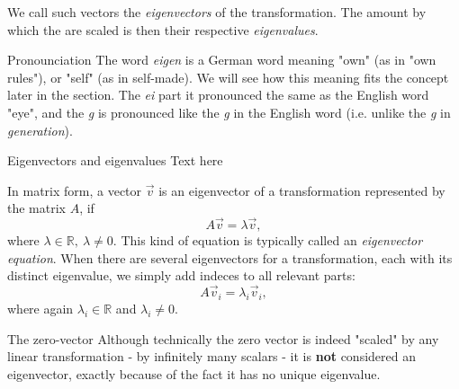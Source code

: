 We call such vectors the \emph{eigenvectors} of the transformation. The amount by which the are scaled is then their respective \emph{eigenvalues}.

\begin{note}{Pronounciation}{}
	The word \textit{eigen} is a German word meaning "own" (as in "own rules"), or "self" (as in self-made). We will see how this meaning fits the concept later in the section. The \textit{ei} part it pronounced the same as the English word "eye", and the \textit{g} is pronounced like the \textit{g} in the English word  (i.e. unlike the \textit{g} in \textit{generation}).
\end{note}

\begin{example}{Eigenvectors and eigenvalues}{}
	Text here
\end{example}

In matrix form, a vector $\vec{v}$ is an eigenvector of a transformation represented by the matrix $A$, if
\begin{equation}
	A\vec{v} = \lambda\vec{v},
	\label{eq:eigenvector_matrix_form}
\end{equation}
where $\lambda\in\mathbb{R},\ \lambda\neq0$. This kind of equation is typically called an \emph{eigenvector equation}. When there are several eigenvectors for a transformation, each with its distinct eigenvalue, we simply add indeces to all relevant parts:
\begin{equation}
	A\vec{v}_{i} = \lambda_{i}\vec{v}_{i},
	\label{eq:eigenvector_matrix_form_indeces}
\end{equation}
where again $\lambda_{i}\in\mathbb{R}$ and $\lambda_{i}\neq0$.

\begin{note}{The zero-vector}{}
	Although technically the zero vector is indeed "scaled" by any linear transformation - by infinitely many scalars - it is \textbf{not} considered an eigenvector, exactly because of the fact it has no unique eigenvalue.
\end{note}

